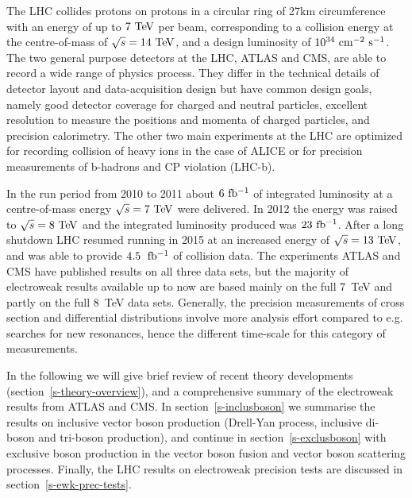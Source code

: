 The LHC collides protons on protons in a circular ring of 27\;km 
circumference with an energy of up to $7\TeV$ per beam, corresponding
to a collision energy at the centre-of-mass of $\rts=14\TeV$, and a 
design luminosity of $10^{34}\cm^{-2}\s^{-1}$. 
The two general purpose detectors at the LHC, ATLAS and CMS, are able to
record a wide range of physics process. They differ in the technical details of detector
layout and data-acquisition design but have common design goals, namely 
good detector coverage for charged and neutral particles, excellent resolution to measure
the positions and momenta of charged particles, and precision calorimetry. The other two
main experiments at the LHC are optimized for recording collision of heavy ions in the 
case of ALICE or for precision measurements of b-hadrons and CP violation (LHC-b).

In the run period from 2010 to 2011 about $6\mbox{\ fb$^{-1}$}$ of integrated
luminosity at a centre-of-mass energy $\rts=7\TeV$ were delivered. In 
2012 the energy was raised to $\rts=8\TeV$ and the integrated luminosity 
produced was $23\mbox{\ fb$^{-1}$}$. 
After a long shutdown LHC resumed running in 2015 at an increased energy of
$\rts=13\TeV$, and was able to provide $4.5\;\mbox{\ fb$^{-1}$}$ of collision data.
The experiments ATLAS and CMS have published results on all three data sets,
but the majority of electroweak results available up to now are based mainly
on the full 7~TeV and partly on the full 8~TeV data sets. Generally, the precision
measurements of cross section and differential distributions involve more analysis
effort compared to e.g. searches for new resonances, hence the different
time-scale for this category	 of measurements. 






In the following we will give brief review 
of recent theory developments (section~\ref{s-theory-overview}), and a comprehensive
summary of the electroweak results from ATLAS and CMS. In section~\ref{s-inclusboson} we summarise the
results on inclusive vector boson production (Drell-Yan process, inclusive di-boson and tri-boson production), 
and continue in section~\ref{s-exclusboson} with exclusive boson production in the vector boson fusion and vector 
boson scattering processes. Finally, the LHC results on electroweak precision tests are discussed 
in section~\ref{s-ewk-prec-tests}. 


